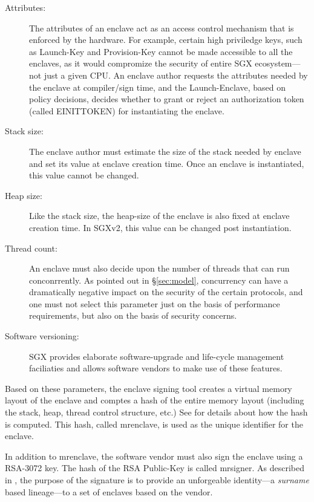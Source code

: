 \documentclass[10pt]{article}
\newcommand{\secref}[1]{\S\ref{#1}}
\newcommand{\mrenclave}{\textsf{mrenclave}}
\newcommand{\mrsigner}{\textsf{mrsigner}}
\begin{document}
  \begin{description}
  \item[Attributes:] The attributes of an enclave act as an access
    control mechanism that is enforced by the hardware. For example,
    certain high priviledge keys, such as Launch-Key and Provision-Key
    cannot be made accessible to all the enclaves, as it would
    compromize the security of entire SGX ecosystem---not just a given
    CPU. An enclave author requests the attributes needed by the
    enclave at compiler/sign time, and the Launch-Enclave, based on
    policy decisions, decides whether to grant or reject an
    authorization token (called \textsf{EINITTOKEN}) for instantiating
    the enclave.

  \item[Stack size:] The enclave author must estimate the size of the
    stack needed by enclave and set its value at enclave creation
    time. Once an enclave is instantiated, this value cannot be
    changed.

  \item[Heap size:] Like the stack size, the heap-size of the enclave
    is also fixed at enclave creation time. In SGXv2, this value can
    be changed post instantiation.

  \item[Thread count:] An enclave must also decide upon the number of
    threads that can run conconrrently. As pointed out in
    \secref{sec:model}, concurrency can have a dramatically negative
    impact on the security of the certain protocols, and one must not
    select this parameter just on the basis of performance
    requirements, but also on the basis of security concerns.

  \item[Software versioning:] SGX provides elaborate software-upgrade
    and life-cycle management faciliaties and allows software vendors
    to make use of these features.

  \end{description}

  Based on these parameters, the enclave signing tool creates a
  virtual memory layout of the enclave and comptes a hash of the
  entire memory layout (including the stack, heap, thread control
  structure, etc.)  See \cite{intelsdm} for details about how the hash
  is computed. This hash, called \mrenclave, is used as the unique
  identifier for the enclave.

  In addition to \textsf{mrenclave}, the software vendor must also
  sign the enclave using a RSA-3072 key. The hash of the RSA
  Public-Key is called \mrsigner. As described in \cite{surnaming},
  the purpose of the signature is to provide an unforgeable
  identity---a \textit{surname} based lineage---to a set of enclaves
  based on the vendor.
\end{document}
